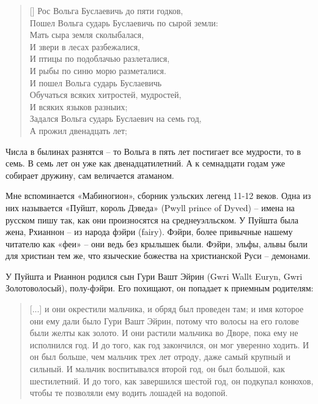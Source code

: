\settowidth{\versewidth}{Пошел Вольга сударь Буслаевичь по сырой земли:} 
\begin{verse}[\versewidth]
Рос Вольга Буслаевичь до пяти годков,\\
Пошел Вольга сударь Буслаевичь по сырой земли:\\
Мать сыра земля сколыбалася,\\
И звери в лесах разбежалися,\\
И птицы по подоблачью разлеталися,\\
И рыбы по синю морю разметалися.\\
И пошел Вольга сударь Буслаевичь\\
Обучаться всяких хитростей, мудростей,\\
И всяких языков разныих;\\
Задался Вольга сударь Буслаевич на семь год,\\
А прожил двенадцать лет;
\end{verse}

Числа в былинах разнятся – то Вольга в пять лет постигает все мудрости, то в семь. В семь лет он уже как двенадцатилетний. А к семнадцати годам уже собирает дружину, сам величается атаманом.

Мне вспоминается «Мабиногион», сборник уэльских легенд 11-12 веков. Одна из них называется «Пуйшт, король Дэведа» (Pwyll prince of Dyved) – имена на русском пишу так, как они произносятся на среднеуэлльском. У Пуйшта была жена, Рхианнон – из народа фэйри (fairy). Фэйри, более привычные нашему читателю как «феи» – они ведь без крылышек были. Фэйри, эльфы, альвы были для христиан тем же, что языческие божества на христианской Руси – демонами.

У Пуйшта и Рианнон родился сын Гури Вашт Эйрин (Gwri Wallt Euryn, Gwri Золотоволосый), полу-фэйри. Его похищают, он попадает к приемным родителям\cite{mabinogion}:

\begin{quotation}
[...] и они окрестили мальчика, и обряд был проведен там; и имя которое они ему дали было Гури Вашт Эйрин, потому что волосы на его голове были желты как золото. И они растили мальчика во Дворе, пока ему не исполнился год. И до того, как год закончился, он мог уверенно ходить. И он был больше, чем мальчик трех лет отроду, даже самый крупный и сильный. И мальчик воспитывался второй год, он был большой, как шестилетний. И до того, как завершился шестой год, он подкупал конюхов, чтобы те позволяли ему водить лошадей на водопой.
\end{quotation}

